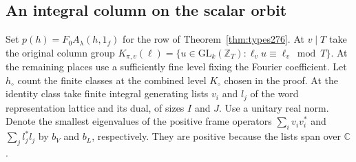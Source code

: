 \documentclass[a4paper,11pt]{article}
\theoremstyle{definition}
\theoremstyle{remark}
\numberwithin{equation}{section}
\begin{document}
\subsection{An integral column on the scalar orbit}\label{nav:VIII-47}
Set \(p(h)=F_0A_\lambda(h,1_f)\) for the row of
Theorem~\ref{thm:types276}. At \(v\mid T\) take the original
column group \(K_{\pi,v}(\ell)=\{u\in\mathrm{GL}_k(\mathbb Z_T):
\ell_v u\equiv\ell_v\bmod T\}\). At the remaining places use
a sufficiently fine level fixing the Fourier coefficient.
Let \(h_\circ\) count the finite classes at the combined level
\(K_\circ\) chosen in the proof. At the identity class take
finite integral generating lists \(v_i\) and \(l_j\) of the
word representation lattice and its dual, of sizes \(I\) and
\(J\). Use a unitary real norm. Denote the smallest eigenvalues
of the positive frame operators \(\sum_i v_i v_i^*\) and
\(\sum_j l_j^*l_j\) by \(b_V\) and \(b_L\), respectively.
They are positive because the lists span over \(\mathbb C\).
\end{document}
